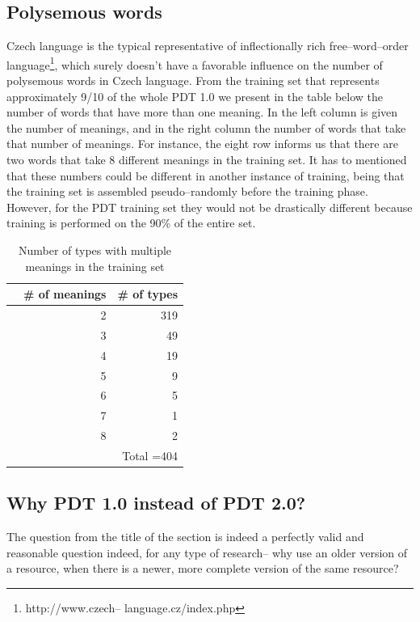 \subsection{Polysemous words}\label{pdt}
Czech language is the typical representative of inflectionally rich free--word--order language\footnote{http://www.czech--
language.cz/index.php}, which surely doesn't have a favorable influence on the number of polysemous words in Czech 
language. From the training set that represents approximately 9/10 of the whole PDT 1.0 we present in the table below the 
number of words that have more than one meaning. In the left column is given the number of meanings, and in the right column 
the number of words that take that number of meanings. For instance, the eight row informs us that there are two words that 
take 8 different meanings in the training set. It has to mentioned that these numbers could be different in another instance of 
training, being that the training set is assembled pseudo--randomly before the training phase. However, for the PDT training set they would not be drastically different because training is performed on the 90\% of the entire set. 
\begin{table}[h!]
\begin{center}
	\begin{tabular}{ r  r |  r }
   	&   \# of meanings & \# of types \\
\hline  
 & 2 & 319  \\
 & 3 & 49  \\
 & 4 & 19  \\
 & 5 & 9  \\
 & 6 & 5  \\
 & 7 & 1  \\
 & 8 & 2  \\
\hline  
& &Total =404\\  
 	\end{tabular}
\end{center}
\caption{Number of types with multiple meanings in the training set}
\end{table}



\subsection{Why PDT 1.0 instead of PDT 2.0?}
The question from the title of the section is indeed a perfectly valid and reasonable question indeed, for 
any type of research-- why use an older version of a resource, when there is a newer, more complete 
version of the same resource?  

